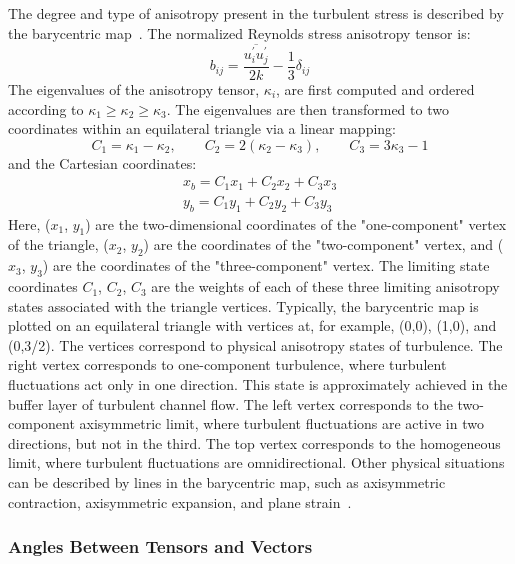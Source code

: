 The degree and type of anisotropy present in the turbulent stress is described by the barycentric map~\cite{banerjee2007presentation}. The normalized Reynolds stress anisotropy tensor is:
%
\begin{equation}
b_{ij}=\frac{\overline{u_{i}^{'}u_{j}^{'}}}{2k}-\frac{1}{3}\delta_{ij}
\label{eq:bij}
\end{equation}
%
The eigenvalues of the anisotropy tensor, $\kappa_i$, are ﬁrst computed and ordered according to $\kappa_{1}\ge\ensuremath{\kappa_{2}\ge\ensuremath{\kappa_{3}}}$. The eigenvalues are then transformed
to two coordinates within an equilateral triangle via a linear mapping:
%
\begin{equation}
C_{1}=\kappa_{1}-\kappa_{2},\qquad C_{2}=2\left(\kappa_{2}-\kappa_{3}\right),\qquad C_{3}=3\kappa_{3}-1
\label{eq:Ci}
\end{equation}
%
and the Cartesian coordinates:
%
\begin{equation}
\begin{array}{c}
x_{b}=C_{1}x_{1}+C_{2}x_{2}+C_{3}x_{3}\\
y_{b}=C_{1}y_{1}+C_{2}y_{2}+C_{3}y_{3}
\end{array}
\label{eq:xbyb}
\end{equation}
%
Here, ($x_1$, $y_1$) are the two-dimensional coordinates of the "one-component" vertex of the triangle, ($x_2$, $y_2$) are the coordinates of the "two-component" vertex, and ($x_3$, $y_3$) are the coordinates of the "three-component" vertex. The limiting state coordinates $C_1$, $C_2$, $C_3$ are the weights of each of these three limiting anisotropy states associated with the triangle vertices. Typically, the barycentric map is plotted on an equilateral triangle with vertices at, for example, (0,0),
(1,0), and (0,3/2). The vertices correspond to physical anisotropy states of turbulence. The right vertex
corresponds to one-component turbulence, where turbulent ﬂuctuations act only in one direction. This state
is approximately achieved in the buffer layer of turbulent channel ﬂow. The left vertex corresponds to the
two-component axisymmetric limit, where turbulent ﬂuctuations are active in two directions, but not in the
third. The top vertex corresponds to the homogeneous limit, where turbulent ﬂuctuations are
omnidirectional. Other physical situations can be described by lines in the barycentric map, such as
axisymmetric contraction, axisymmetric expansion, and plane strain~\cite{banerjee2007presentation}.

\subsubsection{Angles Between Tensors and Vectors}

